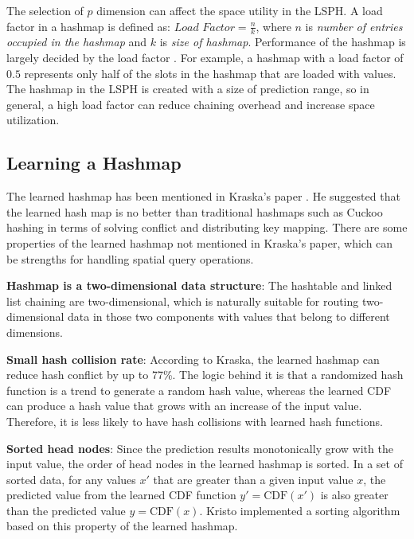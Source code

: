  The selection of $p$ dimension can affect the space utility in the LSPH. A load factor in a hashmap is defined as: $\textit{Load Factor} = \frac{\textit{n}}{\textit{k}} $, where $n$ is \textit{number of entries occupied in the hashmap} and $k$ is \textit{size of hashmap}. Performance of the hashmap is largely decided by the load factor \cite{hashmap}. For example, a hashmap with a load factor of $0.5$ represents only half of the slots in the hashmap that are loaded with values. The hashmap in the LSPH is created with a size of prediction range, so in general, a high load factor can reduce chaining overhead and increase space utilization. 


\subsection{Learning a Hashmap} \label{the_learned_hashmap}


The learned hashmap has been mentioned in Kraska’s paper \cite{Kafle:2017dy}. He suggested that the learned hash map is no better than traditional hashmaps such as Cuckoo hashing in terms of solving conflict and distributing key mapping. There are some properties of the learned hashmap not mentioned in Kraska's paper, which can be strengths for handling spatial query operations. 

\textbf{Hashmap is a two-dimensional data structure}:
The hashtable and linked list chaining are two-dimensional, which is naturally suitable for routing two-dimensional data in those two components with values that belong to different dimensions. 


\textbf{Small hash collision rate}: According to Kraska, the learned hashmap can reduce hash conflict by up to 77\%. The logic behind it is that a randomized hash function is a trend to generate a random hash value, whereas the learned CDF can produce a hash value that grows with an increase of the input value. Therefore, it is less likely to have hash collisions with learned hash functions.

\textbf{Sorted head nodes}: Since the prediction results monotonically grow with the input value, the order of head nodes in the learned hashmap is sorted. In a set of sorted data, for any values $x\prime$ that are greater than a given input value $x$, the predicted value from the learned CDF function $y\prime = \text{CDF}(x\prime)$ is also greater than the predicted value $y = \text{CDF}(x)$. Kristo \cite{Kristo:2020it} implemented a sorting algorithm based on this property of the learned hashmap. 


